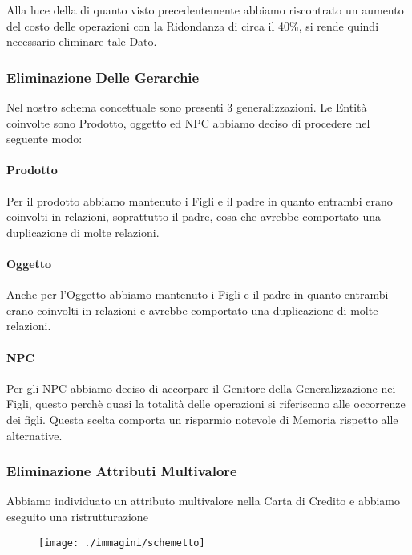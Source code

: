 Alla luce della di quanto visto precedentemente abbiamo riscontrato un aumento del costo delle operazioni con la Ridondanza di circa il 40\%, si rende quindi necessario eliminare tale Dato.



\subsubsection{Eliminazione Delle Gerarchie}

Nel nostro schema concettuale sono presenti 3 generalizzazioni. Le Entità coinvolte sono Prodotto, oggetto ed NPC abbiamo deciso di procedere nel seguente modo:

\paragraph{Prodotto}
Per il prodotto abbiamo mantenuto i Figli e il padre in quanto entrambi erano coinvolti in relazioni, soprattutto il padre, cosa che avrebbe comportato una duplicazione di molte relazioni.
\paragraph{Oggetto} 
Anche per l'Oggetto abbiamo mantenuto i Figli e il padre in quanto entrambi erano coinvolti in relazioni e avrebbe comportato una duplicazione di molte relazioni.
\paragraph{NPC}Per gli NPC abbiamo deciso di accorpare il Genitore della Generalizzazione nei Figli, questo perchè quasi la totalità delle operazioni si riferiscono alle occorrenze dei figli.
Questa scelta comporta un risparmio notevole di Memoria rispetto alle alternative.



\newpage


\begin{landscape} %



\end{landscape}



\subsubsection{Eliminazione Attributi Multivalore}

Abbiamo individuato un attributo multivalore nella Carta di Credito e abbiamo eseguito una ristrutturazione


\begin{figure}[H]
\centering
\texttt{[image: ./immagini/schemetto]}
\caption{}
\label{fig:schemetto}
\end{figure}


